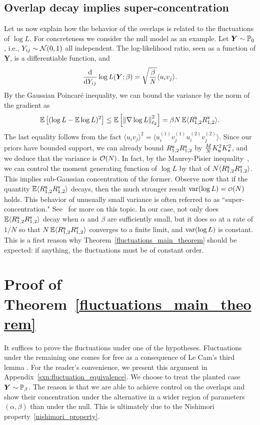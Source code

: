 \documentclass[final,12pt]{colt2018} %
\newcommand{\utt}{\textup{\texttt{u}}}
\newcommand{\vtt}{\textup{\texttt{v}}}
\newcommand{\Y}{\bm{Y}}
\begin{document}
\subsection{Overlap decay implies super-concentration}
Let us now explain how the behavior of the overlaps is related to the fluctuations of $\log L$. For concreteness we consider the null model as an example. Let $\Y\sim \P_{0}$, i.e., $Y_{ij}\sim \mathcal{N}(0,1)$ all independent. The log-likelihood ratio, seen as a function of $\Y$, is a differentiable function, and
\[\frac{\rmd }{\rmd Y_{ij}} \log L(\Y;\beta) = \sqrt{\frac{\beta}{N}}\langle u_iv_j\rangle.\] 
By the Gaussian Poincar\'e inequality, we can bound the variance by the norm of the gradient as
\[\E\left[(\log L - \E \log L)^2\right] \le \E\left[\twonorm{\nabla \log L}^2\right] = \beta N \E\langle R^{\utt}_{1,2}R^{\vtt}_{1,2}\rangle.\]     
The last equality follows from the fact $\langle u_iv_j\rangle^2 = \langle u_i^{(1)}v_j^{(1)}u_i^{(2)}v_j^{(2)}\rangle$. 
Since our priors have bounded support, we can already bound $R^{\utt}_{1,2}R^{\vtt}_{1,2}$ by $\frac{M}{N}K_{\utt}^2K_{\vtt}^2$, and we deduce that the variance is $\mathcal{O}(N)$. In fact, by the Maurey-Pisier inequality~\citep[Theorem 2.2]{Pisier1986}, we can control the moment generating function of $\log L$ by that of $N\langle R^{\utt}_{1,2}R^{\vtt}_{1,2}\rangle$. This implies sub-Gaussian concentration of the former. Observe now that if the quantity $\E\langle R^{\utt}_{1,2}R^{\vtt}_{1,2}\rangle$ decays, then the much stronger result $\var (\log L) = \smallo(N)$ holds. This behavior of unusually small variance is often referred to as ``super-concentration." See~\cite{chatterjee2014superconcentration} for more on this topic. In our case, not only does $\E\langle R^{\utt}_{1,2}R^{\vtt}_{1,2}\rangle$ decay when $\alpha$ and $\beta$ are sufficiently small, but it does so at a rate of $1/N$ so that $N\E\langle R^{\utt}_{1,2}R^{\vtt}_{1,2}\rangle$ converges to a finite limit, and $\operatorname{var} (\log L)$ is constant. This is a first reason why Theorem~\ref{fluctuations_main_theorem} should be expected: if anything, the fluctuations must be of constant order.    

\section{Proof of Theorem~\ref{fluctuations_main_theorem}}
It suffices to prove the fluctuations under one of the hypotheses. Fluctuations under the remaining one comes for free as a consequence of Le Cam's third lemma \citep[or more specifically, the Portmanteau theorem][Theorem 6.6]{vandervaart2000asymptotic}. For the reader's convenience, we present this argument in Appendix~\ref{sxn:fluctuation_equivalence}. We choose to treat the planted case $\Y \sim \P_{\beta}$. The reason is that we are able to achieve control on the overlaps and show their concentration under the alternative in a wider region of parameters $(\alpha,\beta)$ than under the null. This is ultimately due to the Nishimori property~\eqref{nishimori_property}. 
  
\end{document}
